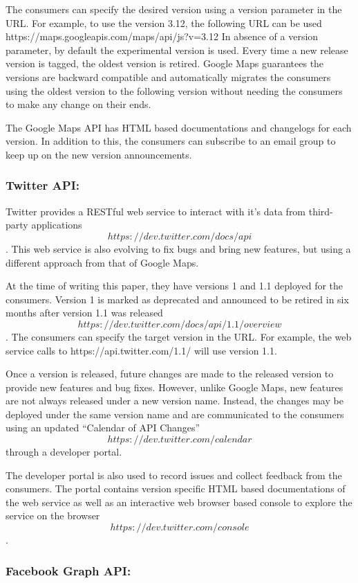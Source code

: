 \documentclass[runningheads,a4paper]{llncs}
\begin{document}
The consumers can specify the desired version using a version parameter in the URL. For example, to use the version 3.12, the following URL can be used https://maps.googleapis.com/maps/api/js?v=3.12 In absence of a version parameter, by default the experimental version is used.
Every time a new release version is tagged, the oldest version is retired. Google Maps guarantees the versions are backward compatible and automatically migrates the consumers using the oldest version to the following version without needing the consumers to make any change on their ends.

The Google Maps API has HTML based documentations and changelogs for each version. In addition to this, the consumers can subscribe to an email group to keep up on the new version announcements.


\subsubsection{Twitter API:}
Twitter provides a RESTful web service to interact with it’s data from third-party applications \[https://dev.twitter.com/docs/api\]. This web service is also evolving to fix bugs and bring new features, but using a different approach from that of Google Maps.

At the time of writing this paper, they have versions 1 and 1.1 deployed for the consumers. Version 1 is marked as deprecated and announced to be retired in six months after version 1.1 was released\[https://dev.twitter.com/docs/api/1.1/overview\]. The consumers can specify the target version in the URL. For example, the web service calls to https://api.twitter.com/1.1/ will use version 1.1.

Once a version is released, future changes are made to the released version to provide new features and bug fixes. However, unlike Google Maps, new features are not always released under a new version name. Instead, the changes may be deployed under the same version name and are communicated to the consumers using an updated “Calendar of API Changes” \[https://dev.twitter.com/calendar\] through a developer portal.

The developer portal is also used to record issues and collect feedback from the consumers. The portal contains version specific HTML based documentations of the web service as well as an interactive web browser based console to explore the service on the browser \[https://dev.twitter.com/console\].

\subsubsection{Facebook Graph API:}
\end{document}
